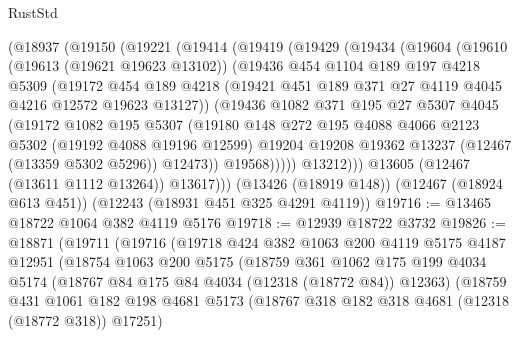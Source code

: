 \begin{lexlean}{RustStd}
\begin{coremodule}
    (@18937
      (@19150
        (@19221
          (@19414
            (@19419
              (@19429
                (@19434
                  (@19604
                    (@19610
                      (@19613 (@19621 @19623 @13102))
                      (@19436
                        @454
                        @1104
                        @189
                        @197
                        @4218
                        @5309
                        (@19172
                          @454
                          @189
                          @4218
                          (@19421 @451 @189 @371 @27 @4119 @4045 @4216 @12572 @19623 @13127))
                        (@19436
                          @1082
                          @371
                          @195
                          @27
                          @5307
                          @4045
                          (@19172
                            @1082
                            @195
                            @5307
                            (@19180
                              @148
                              @272
                              @195
                              @4088
                              @4066
                              @2123
                              @5302
                              (@19192 @4088 @19196 @12599)
                              @19204
                              @19208
                              @19362
                              @13237
                              (@12467 (@13359 @5302 @5296))
                              @12473))
                          @19568)))))
                @13212)))
          @13605
          (@12467 (@13611 @1112 @13264))
          @13617)))
    (@13426 (@18919 @148))
    (@12467 (@18924 @613 @451))
    (@12243 (@18931 @451 @325 @4291 @4119))
@19716 := @13465 @18722 @1064 @382 @4119 @5176
@19718 := @12939 @18722 @3732
@19826 := @18871
    (@19711
      (@19716
        (@19718
          @424
          @382
          @1063
          @200
          @4119
          @5175
          @4187
          @12951
          (@18754
            @1063
            @200
            @5175
            (@18759
              @361
              @1062
              @175
              @199
              @4034
              @5174
              (@18767 @84 @175 @84 @4034 (@12318 (@18772 @84)) @12363)
              (@18759
                @431
                @1061
                @182
                @198
                @4681
                @5173
                (@18767 @318 @182 @318 @4681 (@12318 (@18772 @318)) @17251)

\end{coremodule}
\end{lexlean}
